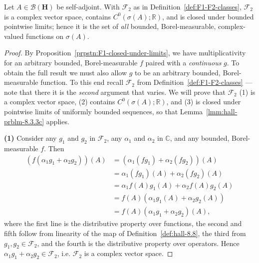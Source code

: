 \begin{proposition}
    \label{prpstn:F2-is-everything}
    \leanok
    Let $A \in \mathcal{B}(\mathbf{H})$ be self-adjoint. With $\mathcal{F}_2$ as in Definition~\ref{def:F1-F2-classes}, $\mathcal{F}_2$ is a complex vector space, contains $C^0(\sigma(A); \mathbb{R})$, and is closed under bounded pointwise limits; hence it is the set of \textit{all} bounded, Borel-measurable, complex-valued functions on $\sigma(A)$.
\end{proposition}
\begin{proof}
    \leanok
By Proposition~\ref{prpstn:F1-closed-under-limits}, we have multiplicativity for an arbitrary bounded, Borel-measurable $f$ paired with a \textit{continuous} $g$. To obtain the full result we must also allow $g$ to be an arbitrary bounded, Borel-measurable function. To this end recall $\mathcal{F}_2$ from Definition~\ref{def:F1-F2-classes} — note that there it is the \textit{second} argument that varies. We will prove that $\mathcal{F}_2$ (1) is a complex vector space, (2) contains $C^0(\sigma(A); \mathbb{R})$, and (3) is closed under pointwise limits of uniformly bounded sequences, so that Lemma~\ref{lmm:hall-prblm-8.3.3c} applies.

\textbf{(1)} Consider any $g_1$ and $g_2$ in $\mathcal{F}_2$, any $\alpha_1$ and $\alpha_2$ in $\mathbb{C}$, and any bounded, Borel-measurable $f$. Then
\begin{align}
    (f(\alpha_1g_1 + \alpha_2g_2))(A) &= (\alpha_1(fg_1) + \alpha_2(fg_2))(A) \\
                                      &= \alpha_1(fg_1)(A) + \alpha_2(fg_2)(A) \\
                                      &= \alpha_1f(A)g_1(A) + \alpha_2f(A)g_2(A) \\
                                      &= f(A)\left( \alpha_1g_1(A) + \alpha_2g_2(A) \right) \\
                                      &= f(A)(\alpha_1g_1 + \alpha_2g_2)(A),
\end{align}
where the first line is the distributive property over functions, the second and fifth follow from linearity of the map of Definition~\ref{def:hall-8.8}, the third from $g_1, g_2 \in \mathcal{F}_2$, and the fourth is the distributive property over operators. Hence $\alpha_1g_1 + \alpha_2g_2 \in \mathcal{F}_2$, i.e. $\mathcal{F}_2$ is a complex vector space.


\end{proof}
